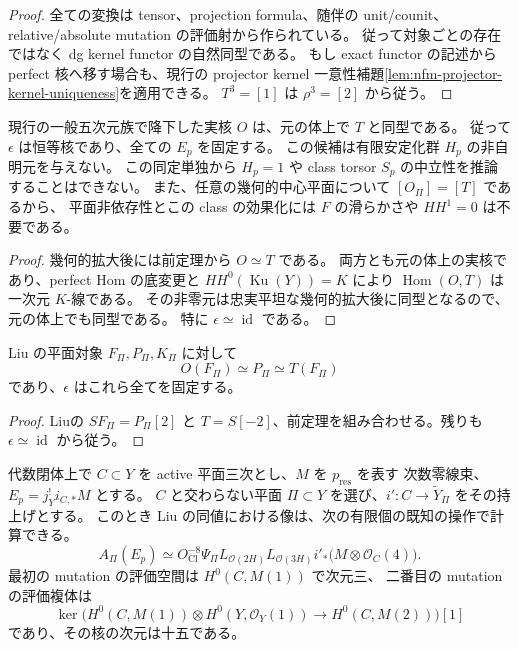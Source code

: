 \begin{proof}
全ての変換は tensor、projection formula、随伴の unit/counit、
relative/absolute mutation の評価射から作られている。
従って対象ごとの存在ではなく dg kernel functor の自然同型である。
もし exact functor の記述から perfect 核へ移す場合も、現行の
projector kernel 一意性補題\ref{lem:nfm-projector-kernel-uniqueness}を適用できる。
$T^3=[1]$ は $\rho^3=[2]$ から従う。
\end{proof}

\begin{corollary}
\label{cor:nfm-fivefold-half-rotation-candidate-trivial}
現行の一般五次元族で降下した実核 $O$ は、元の体上で $T$ と同型である。
従って $\epsilon$ は恒等核であり、全ての $E_p$ を固定する。
この候補は有限安定化群 $H_p$ の非自明元を与えない。
この同定単独から $H_p=1$ や class torsor $S_p$ の中立性を推論することはできない。
また、任意の幾何的中心平面について $[O_\Pi]=[T]$ であるから、
平面非依存性とこの class の効果化には $F$ の滑らかさや $HH^1=0$ は不要である。
\end{corollary}

\begin{proof}
幾何的拡大後には前定理から $O\simeq T$ である。
両方とも元の体上の実核であり、perfect Hom の底変更と
$HH^0(\operatorname{Ku}(Y))=K$ により $\operatorname{Hom}(O,T)$ は一次元 $K$-線である。
その非零元は忠実平坦な幾何的拡大後に同型となるので、元の体上でも同型である。
特に $\epsilon\simeq\operatorname{id}$ である。
\end{proof}


\begin{corollary}[平面対象に対する作用]
\label{cor:nfm-fivefold-half-rotation-plane-objects}
Liu の平面対象 $F_\Pi,P_\Pi,K_\Pi$ に対して
\[
 O(F_\Pi)\simeq P_\Pi\simeq T(F_\Pi)
\]
であり、$\epsilon$ はこれら全てを固定する。
\end{corollary}

\begin{proof}
Liu\cite[Remark~3.5]{NFMPeizeLiuFivefold}の $SF_\Pi=P_\Pi[2]$ と
$T=S[-2]$、前定理を組み合わせる。残りも $\epsilon\simeq\operatorname{id}$ から従う。
\end{proof}

\begin{proposition}
\label{prop:nfm-fivefold-origin-clifford-complex}
代数閉体上で $C\subset Y$ を active 平面三次とし、$M$ を $p_{\mathrm{res}}$ を表す
次数零線束、$E_p=j_Y^!i_{C,*}M$ とする。
$C$ と交わらない平面 $\Pi\subset Y$ を選び、$i':C\to\widetilde Y_\Pi$ をその持上げとする。
このとき Liu の同値における像は、次の有限個の既知の操作で計算できる。
\begin{equation}\label{eq:nfm-fivefold-origin-clifford-complex}
 A_\Pi(E_p)
 \simeq O_{\mathrm{Cl}}^{-8}\Psi_\Pi
 L_{\mathcal O(2H)}L_{\mathcal O(3H)}
 i'_*\bigl(M\otimes\mathcal O_C(4)\bigr).
\end{equation}
最初の mutation の評価空間は $H^0(C,M(1))$ で次元三、
二番目の mutation の評価複体は
\[
 \ker\bigl(H^0(C,M(1))\otimes H^0(Y,\mathcal O_Y(1))
          \longrightarrow H^0(C,M(2))\bigr)[1]
\]
であり、その核の次元は十五である。
\end{proposition}

